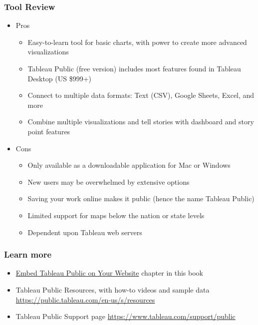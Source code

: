\documentclass[
  english,
]{book}
\providecommand{\tightlist}{%
  \setlength{\itemsep}{0pt}\setlength{\parskip}{0pt}}
\begin{document}
\hypertarget{tool-review-1}{%
\subsubsection*{Tool Review}\label{tool-review-1}}

\begin{itemize}
\tightlist
\item
  Pros

  \begin{itemize}
  \tightlist
  \item
    Easy-to-learn tool for basic charts, with power to create more advanced visualizations
  \item
    Tableau Public (free version) includes most features found in Tableau Desktop (US \$999+)
  \item
    Connect to multiple data formats: Text (CSV), Google Sheets, Excel, and more
  \item
    Combine multiple visualizations and tell stories with dashboard and story point features
  \end{itemize}
\item
  Cons

  \begin{itemize}
  \tightlist
  \item
    Only available as a downloadable application for Mac or Windows
  \item
    New users may be overwhelmed by extensive options
  \item
    Saving your work online makes it public (hence the name Tableau Public)
  \item
    Limited support for maps below the nation or state levels
  \item
    Dependent upon Tableau web servers
  \end{itemize}
\end{itemize}

\hypertarget{learn-more-8}{%
\subsubsection*{Learn more}\label{learn-more-8}}

\begin{itemize}
\tightlist
\item
  \href{iframe-tableau}{Embed Tableau Public on Your Website} chapter in this book
\item
  Tableau Public Resources, with how-to videos and sample data \url{https://public.tableau.com/en-us/s/resources}
\item
  Tableau Public Support page \url{https://www.tableau.com/support/public}
\end{itemize}
\end{document}
